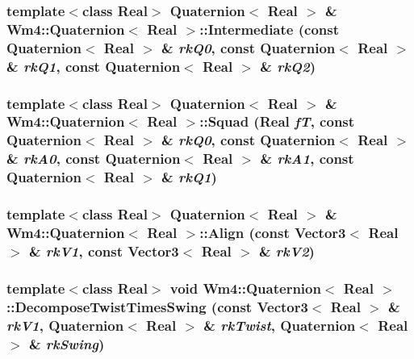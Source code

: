 \subsubsection{\setlength{\rightskip}{0pt plus 5cm}template$<$class Real$>$ {\bf Quaternion}$<$ Real $>$ \& {\bf Wm4::Quaternion}$<$ Real $>$::Intermediate (const {\bf Quaternion}$<$ Real $>$ \& {\em rk\-Q0}, const {\bf Quaternion}$<$ Real $>$ \& {\em rk\-Q1}, const {\bf Quaternion}$<$ Real $>$ \& {\em rk\-Q2})}\label{classWm4_1_1Quaternion_78406c8173e77435e8ce1b13ef7c1f9c}


\subsubsection{\setlength{\rightskip}{0pt plus 5cm}template$<$class Real$>$ {\bf Quaternion}$<$ Real $>$ \& {\bf Wm4::Quaternion}$<$ Real $>$::Squad (Real {\em f\-T}, const {\bf Quaternion}$<$ Real $>$ \& {\em rk\-Q0}, const {\bf Quaternion}$<$ Real $>$ \& {\em rk\-A0}, const {\bf Quaternion}$<$ Real $>$ \& {\em rk\-A1}, const {\bf Quaternion}$<$ Real $>$ \& {\em rk\-Q1})}\label{classWm4_1_1Quaternion_b42ada6b188697a1d1bec34e78330ed0}


\subsubsection{\setlength{\rightskip}{0pt plus 5cm}template$<$class Real$>$ {\bf Quaternion}$<$ Real $>$ \& {\bf Wm4::Quaternion}$<$ Real $>$::Align (const {\bf Vector3}$<$ Real $>$ \& {\em rk\-V1}, const {\bf Vector3}$<$ Real $>$ \& {\em rk\-V2})}\label{classWm4_1_1Quaternion_afed22a39ac03d0b74984e133f1d1bed}


\subsubsection{\setlength{\rightskip}{0pt plus 5cm}template$<$class Real$>$ void {\bf Wm4::Quaternion}$<$ Real $>$::Decompose\-Twist\-Times\-Swing (const {\bf Vector3}$<$ Real $>$ \& {\em rk\-V1}, {\bf Quaternion}$<$ Real $>$ \& {\em rk\-Twist}, {\bf Quaternion}$<$ Real $>$ \& {\em rk\-Swing})}\label{classWm4_1_1Quaternion_70782459e82bba89d1f558db35989ede}


